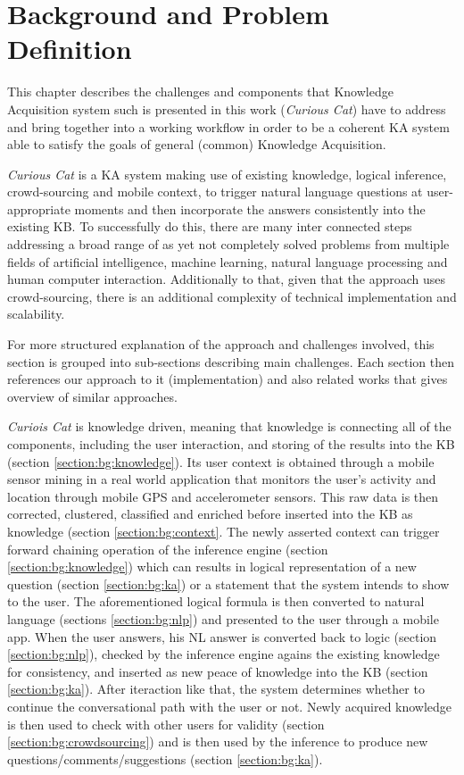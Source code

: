 \chapter{Background and Problem Definition}
\label{chapter:background}
This chapter describes the challenges and components that Knowledge Acquisition 
system such is presented in this work (\emph{Curious Cat}) have to address and 
bring together into a working workflow in order to be a coherent KA system able 
to satisfy the goals of general (common) Knowledge Acquisition. 

\emph{Curious Cat} is a KA system making use of existing knowledge, 
logical inference, crowd-sourcing and mobile context, to trigger natural language
questions at user-appropriate moments and then incorporate the answers consistently
into the existing KB. To successfully do this, there are many inter connected
steps addressing a broad range of as yet not completely solved problems from
multiple fields of artificial intelligence, machine learning, natural language
processing and human computer interaction. Additionally to that, given
that the approach uses crowd-sourcing, there is an additional complexity
of technical implementation and scalability. 

For more structured explanation of the approach and challenges involved, this
section is grouped into sub-sections describing main challenges. Each section
then references our approach to it (implementation) and also related works that
gives overview of similar approaches.

\emph{Curiois Cat} is knowledge driven, meaning that knowledge is connecting
all of the components, including the user interaction, and storing of the
results into the KB (section \ref{section:bg:knowledge}). Its user context is 
obtained through a mobile sensor mining in a real world application that 
monitors the user’s activity and location through mobile GPS and accelerometer 
sensors. This raw data is then corrected, clustered, classified and enriched 
before inserted into the KB as knowledge (section \ref{section:bg:context}.
The newly asserted context can trigger forward chaining operation of the 
inference engine (section \ref{section:bg:knowledge}) which can results in
logical representation of a new question (section \ref{section:bg:ka}) or a 
statement that the system intends to show to the user. The aforementioned  
logical formula is then converted to natural language (sections 
\ref{section:bg:nlp}) and presented to the user through a mobile app. 
When the user answers, his NL answer is converted back to logic 
(section \ref{section:bg:nlp}), checked by the inference engine agains the 
existing knowledge for consistency, and inserted as new peace of knowledge into 
the KB (section \ref{section:bg:ka}). After iteraction like that, the
system determines whether to continue the conversational path with the user or
 not. Newly acquired knowledge is then used to check with other users for
validity (section \ref{section:bg:crowdsourcing}) and is then used by the 
inference to produce new questions/comments/suggestions (section 
\ref{section:bg:ka}).

